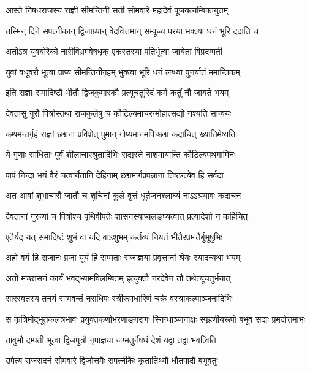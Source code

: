 \begin{center}
\twolineshloka
{आस्ते निषधराजस्य राज्ञी सीमन्तिनी सती}
{सोमवारे महादेवं पूजयत्यम्बिकायुतम्} %

\twolineshloka
{तस्मिन् दिने सपत्नीकान् द्विजाग्र्यान् वेदवित्तमान्}
{सम्पूज्य परया भक्त्या धनं भूरि ददाति च} %

\twolineshloka
{अतोऽत्र युवयोरैको नारीविभ्रमवेषधृक्}
{एकस्तस्या पतिर्भूत्वा जायेतां विप्रदम्पती} %

\twolineshloka
{युवां वधूवरौ भूत्वा प्राप्य सीमन्तिनीगृहम्}
{भुक्त्वा भूरि धनं लब्ध्वा पुनर्यातं ममान्तिकम्} %

\twolineshloka
{इति राज्ञा समादिष्टौ भीतौ द्विजकुमारकौ}
{प्रत्यूचतुरिदं कर्म कर्तुं नौ जायते भयम्} %

\twolineshloka
{देवतासु गुरौ पित्रोस्तथा राजकुलेषु च}
{कौटिल्यमाचरन्मोहात्सद्यो नश्यति सान्वयः} %

\twolineshloka
{कथमन्तर्गृहं राज्ञां छद्मना प्रविशेत् पुमान्}
{गोप्यमानमपिच्छद्म कदाचित् ख्यातिमेष्यति} %

\twolineshloka
{ये गुणाः साधिताः पूर्वं शीलाचारश्रुतादिभिः}
{सद्यस्ते नाशमायान्ति कौटिल्यपथगामिनः} %

\twolineshloka
{पापं निन्दा भयं वैरं चत्वार्येतानि देहिनाम्}
{छद्ममार्गप्रपन्नानां तिष्ठन्त्येव हि सर्वदा} %

\twolineshloka
{अत आवां शुभाचारौ जातौ च शुचिनां कुले}
{वृत्तं धूर्तजनश्लाघ्यं नाऽऽश्रयावः कदाचन} %

\twolineshloka
{दैवतानां गुरूणां च पित्रोश्च पृथिवीपतेः}
{शासनस्याप्यलङ्घ्यत्वात् प्रत्यादेशो न कर्हिचित्} %

\twolineshloka
{एतैर्यद् यत् समादिष्टं शुभं वा यदि वाऽशुभम्}
{कर्तव्यं नियतं भीतैरप्रमत्तैर्बुभूषुभिः} %

\twolineshloka
{अहो वयं हि राजानः प्रजा यूयं हि सम्मताः}
{राजाज्ञया प्रवृत्तानां श्रेयः स्यादन्यथा भयम्} %

\twolineshloka
{अतो मच्छासनं कार्यं भवद्भ्यामविलम्बितम्}
{इत्युक्तौ नरदेवेन तौ तथेत्यूचतुर्भयात्} %

\twolineshloka
{सारस्वतस्य तनयं सामवन्तं नराधिपः}
{स्त्रीरूपधारिणं चक्रे वस्त्राकल्पाञ्जनादिभिः} %

\fourlineindentedshloka
{स कृत्रिमोद्भूतकलत्रभावः}
{प्रयुक्तकर्णाभरणाङ्गरागः}
{स्निग्धाञ्जनाक्षः स्पृहणीयरूपो}
{बभूव सद्यः प्रमदोत्तमाभः} %

\twolineshloka
{तावुभौ दम्पती भूत्वा द्विजपुत्रौ नृपाज्ञया}
{जग्मतुर्नैषधं देशं यद्वा तद्वा भवत्विति} %

\twolineshloka
{उपेत्य राजसदनं सोमवारे द्विजोत्तमैः}
{सपत्नीकैः कृतातिथ्यौ धौतपादौ बभूवतुः} %


\end{center}
